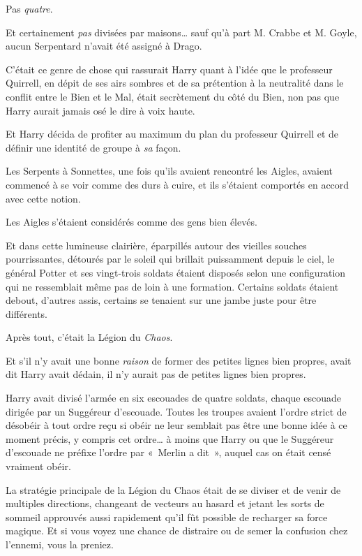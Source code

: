 Pas \emph{quatre}.

Et certainement \emph{pas} divisées par maisons… sauf qu'à part M. Crabbe et M. Goyle, aucun Serpentard n'avait été assigné à Drago.

C'était ce genre de chose qui rassurait Harry quant à l'idée que le professeur Quirrell, en dépit de ses airs sombres et de sa prétention à la neutralité dans le conflit entre le Bien et le Mal, était secrètement du côté du Bien, non pas que Harry aurait jamais osé le dire à voix haute.

Et Harry décida de profiter au maximum du plan du professeur Quirrell et de définir une identité de groupe à \emph{sa} façon.

Les Serpents à Sonnettes, une fois qu'ils avaient rencontré les Aigles, avaient commencé à se voir comme des durs à cuire, et ils s'étaient comportés en accord avec cette notion.

Les Aigles s'étaient considérés comme des gens bien élevés.

Et dans cette lumineuse clairière, éparpillés autour des vieilles souches pourrissantes, détourés par le soleil qui brillait puissamment depuis le ciel, le général Potter et ses vingt-trois soldats étaient disposés selon une configuration qui ne ressemblait même pas de loin à une formation. Certains soldats étaient debout, d'autres assis, certains se tenaient sur une jambe juste pour être différents.

Après tout, c'était la Légion du \emph{Chaos}.

Et s'il n'y avait une bonne \emph{raison} de former des petites lignes bien propres, avait dit Harry avait dédain, il n'y aurait pas de petites lignes bien propres.

Harry avait divisé l'armée en six escouades de quatre soldats, chaque escouade dirigée par un Suggéreur d'escouade. Toutes les troupes avaient l'ordre strict de désobéir à tout ordre reçu si obéir ne leur semblait pas être une bonne idée à ce moment précis, y compris cet ordre… à moins que Harry ou que le Suggéreur d'escouade ne préfixe l'ordre par «~Merlin a dit~», auquel cas on était censé vraiment obéir.

La stratégie principale de la Légion du Chaos était de se diviser et de venir de multiples directions, changeant de vecteurs au hasard et jetant les sorts de sommeil approuvés aussi rapidement qu'il fût possible de recharger sa force magique. Et si vous voyez une chance de distraire ou de semer la confusion chez l'ennemi, vous la preniez.

